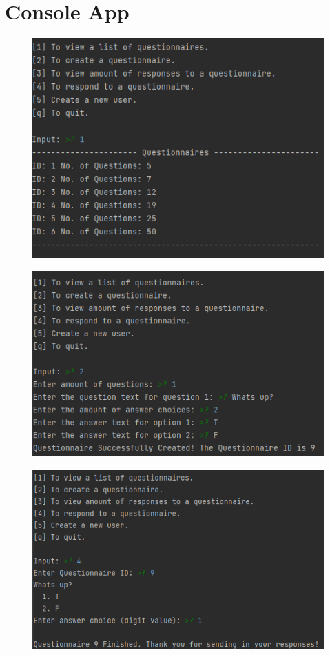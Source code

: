 \documentclass[12pt, oneside]{article}
\begin{document}
    \section{Console App}
    \FloatBarrier
    \begin{figure}[H] 
        \centerline{
        \includegraphics[scale=0.7]{console_list_of_questionnaires.PNG}
        }
    \end{figure}
    \FloatBarrier
    \begin{figure}[H] 
        \centerline{
        \includegraphics[scale=0.7]{console_create_questionnaire.PNG}
        }
    \end{figure}
    \FloatBarrier
    \begin{figure}[H] 
        \centerline{
        \includegraphics[scale=0.7]{console_response.PNG}
        }
    \end{figure}
\end{document}

